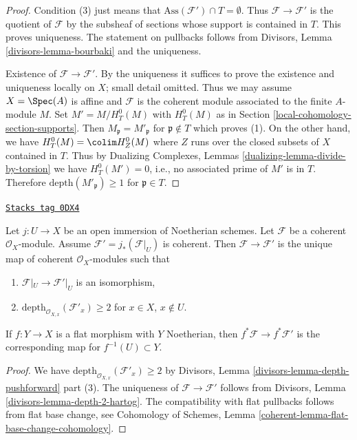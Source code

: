 \begin{proof}
Condition (3) just means that $\text{Ass}(\mathcal{F}') \cap T = \emptyset$.
Thus $\mathcal{F} \to \mathcal{F}'$ is the quotient of $\mathcal{F}$
by the subsheaf of sections whose support is contained in $T$.
This proves uniqueness. The statement on pullbacks follows from
Divisors, Lemma \ref{divisors-lemma-bourbaki}
and the uniqueness.

\medskip\noindent
Existence of $\mathcal{F} \to \mathcal{F}'$.
By the uniqueness it suffices to prove the
existence and uniqueness locally on $X$; small detail omitted.
Thus we may assume $X = \Spec(A)$ is affine and $\mathcal{F}$
is the coherent module associated to the finite $A$-module $M$.
Set $M' = M / H^0_T(M)$ with $H^0_T(M)$ as in Section \ref{local-cohomology-section-supports}.
Then $M_\mathfrak p = M'_\mathfrak p$ for $\mathfrak p \not \in T$
which proves (1). On the other hand, we have
$H^0_T(M) = \colim H^0_Z(M)$ where $Z$ runs over the closed
subsets of $X$ contained in $T$. Thus by
Dualizing Complexes, Lemmas \ref{dualizing-lemma-divide-by-torsion}
we have $H^0_T(M') = 0$, i.e., no associated prime
of $M'$ is in $T$. Therefore $\text{depth}(M'_\mathfrak p) \geq 1$
for $\mathfrak p \in T$.
\end{proof}

\begin{lemma}
\label{local-cohomology-lemma-get-depth-2-along-Z}
\href{https://stacks.math.columbia.edu/tag/0DX4}{\texttt{Stacks tag 0DX4}}

Let $j : U \to X$ be an open immersion of Noetherian schemes.
Let $\mathcal{F}$ be a coherent $\mathcal{O}_X$-module.
Assume $\mathcal{F}' = j_*(\mathcal{F}|_U)$ is coherent.
Then $\mathcal{F} \to \mathcal{F}'$ is the unique map
of coherent $\mathcal{O}_X$-modules such that
\begin{enumerate}
\item $\mathcal{F}|_U \to \mathcal{F}'|_U$
is an isomorphism,
\item $\text{depth}_{\mathcal{O}_{X, x}}(\mathcal{F}'_x) \geq 2$
for $x \in X$, $x \not \in U$.
\end{enumerate}
If $f : Y \to X$ is a flat morphism with $Y$ Noetherian, then
$f^*\mathcal{F} \to f^*\mathcal{F}'$ is the corresponding
map for $f^{-1}(U) \subset Y$.
\end{lemma}

\begin{proof}
We have $\text{depth}_{\mathcal{O}_{X, x}}(\mathcal{F}'_x) \geq 2$
by Divisors, Lemma \ref{divisors-lemma-depth-pushforward} part (3).
The uniqueness of $\mathcal{F} \to \mathcal{F}'$ follows from
Divisors, Lemma \ref{divisors-lemma-depth-2-hartog}.
The compatibility with flat pullbacks follows from
flat base change, see Cohomology of Schemes, Lemma
\ref{coherent-lemma-flat-base-change-cohomology}.
\end{proof}

